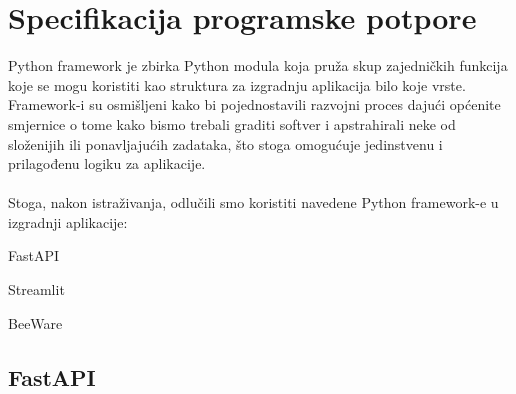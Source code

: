 \chapter{Specifikacija programske potpore}
	Python framework je zbirka Python modula koja pruža skup zajedničkih funkcija koje se mogu koristiti kao struktura za izgradnju aplikacija bilo koje vrste.\\
	Framework-i su osmišljeni kako bi pojednostavili razvojni proces dajući općenite smjernice o tome kako bismo trebali graditi softver i apstrahirali neke od složenijih ili ponavljajućih zadataka, što stoga omogućuje jedinstvenu i prilagođenu logiku za aplikacije.\\
	\\
	Stoga, nakon istraživanja, odlučili smo koristiti navedene Python framework-e u izgradnji aplikacije:

	\begin{packed_enum}

		\item FastAPI
		\item Streamlit
		\item BeeWare

	\end{packed_enum}

	\bigskip

	\section{FastAPI}

